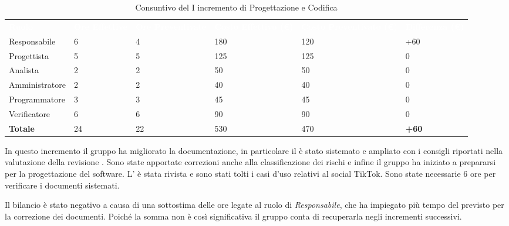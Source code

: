 \begin{table}[H]
\begin{center}
\renewcommand{\arraystretch}{1.5}
\begin{tabular}{ m{}<{\centering}  m{}<{\centering} m{}<{\centering} m{}<{\centering} m{}<{\centering} m{}<{\centering}}
	\rowcolor{darkblue}
	\textcolor{white}{\textbf{Ruolo}} & \textcolor{white}{\textbf{Ore Effettive}} & \textcolor{white}{\textbf{Ore Preventivate}}&\textcolor{white}{\textbf{Costo Effettivo (\euro)}}&\textcolor{white}{\textbf{Costo Preventivato (\euro)}}&\textcolor{white}{\textbf{Differenza (\euro)}}\\ 

	Responsabile  & 6 & 4 & 180 & 120 & +60\\	
	
	Progettista & 5 & 5 & 125 & 125 & 0\\
	
	Analista & 2 & 2 & 50 & 50 & 0\\
	
	Amministratore & 2 & 2 & 40 & 40 & 0\\
	
	Programmatore & 3 & 3 & 45 & 45 & 0\\
	
	Verificatore & 6 & 6 & 90 & 90 & 0\\
	
	\textbf{Totale} & 24 & 22 & 530 & 470 & \textbf{+60} \\
	
\end{tabular}
\caption{Consuntivo del I incremento di Progettazione e Codifica}
\end{center}
\end{table}

In questo incremento il gruppo ha migliorato la documentazione, in particolare il \PdP{} è stato sistemato e ampliato con i consigli riportati nella valutazione della revisione \RTB{}. Sono state apportate correzioni anche alla classificazione dei rischi e infine il gruppo ha iniziato a prepararsi per la progettazione del software.
L'\AdR{} è stata rivista e sono stati tolti i casi d'uso relativi al social TikTok.
Sono state necessarie 6 ore per verificare i documenti sistemati.

Il bilancio è stato negativo a causa di una sottostima delle ore legate al ruolo di \textit{Responsabile}, che ha impiegato più tempo del previsto per la correzione dei documenti. Poiché la somma non è così significativa il gruppo conta di recuperarla negli incrementi successivi.

